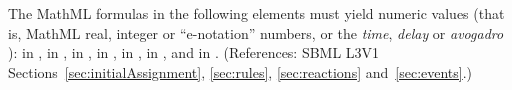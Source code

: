 The MathML formulas in the following elements must yield numeric
values (that is, MathML real, integer or ``e-notation'' numbers,
or the \emph{time}, \emph{delay} or \emph{avogadro} ):
 in \KineticLaw,  in
\InitialAssignment,  in \AssignmentRule,  in
\RateRule,  in \AlgebraicRule,  in \Event
\Delay, and  in \EventAssignment.  (References: SBML L3V1 
Sections~\ref{sec:initialAssignment}, \ref{sec:rules}, 
\ref{sec:reactions} and~\ref{sec:events}.)


